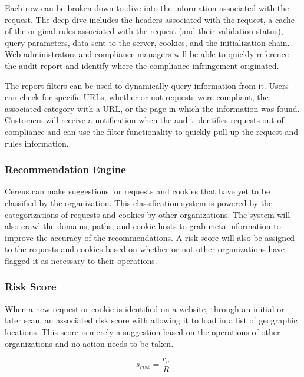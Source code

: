 Each row can be broken down to dive into the information associated with the request. The deep dive includes the headers associated with the request, a cache of the original rules associated with the request (and their validation status), query parameters, data sent to the server, cookies, and the initialization chain. Web administrators and compliance managers will be able to quickly reference the audit report and identify where the compliance infringement originated.


The report filters can be used to dynamically query information from it. Users can check for specific URLs, whether or not requests were compliant, the associated category with a URL, or the page in which the information was found. Customers will receive a notification when the audit identifies requests out of compliance and can use the filter functionality to quickly pull up the request and rules information. 

\subsubsection{Recommendation Engine}

Cereus can make suggestions for requests and cookies that have yet to be classified by the organization. This classification system is powered by the categorizations of requests and cookies by other organizations. The system will also crawl the domains, paths, and cookie hosts to grab meta information to improve the accuracy of the recommendations. A risk score will also be assigned to the requests and cookies based on whether or not other organizations have flagged it as necessary to their operations.

\subsubsection*{Risk Score}

When a new request or cookie is identified on a website, through an initial or later scan, an associated risk score with allowing it to load in a list of geographic locations. This score is merely a suggestion based on the operations of other organizations and no action needs to be taken.

\[ s_{risk} = \frac{r_n}{R} \]

